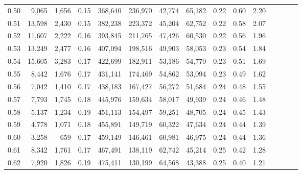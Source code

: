 \begin{tabular}{rrrcrrrrrrrrrrr}
0.50 &   9,065 &   1,656 &                                       0.15 &  368,640 &  236,970 &   42,774 &   65,182 &  0.22 &  0.60 &                         2.20 \\
0.51 &  13,598 &   2,430 &                                       0.15 &  382,238 &  223,372 &   45,204 &   62,752 &  0.22 &  0.58 &                         2.07 \\
0.52 &  11,607 &   2,222 &                                       0.16 &  393,845 &  211,765 &   47,426 &   60,530 &  0.22 &  0.56 &                         1.96 \\
0.53 &  13,249 &   2,477 &                                       0.16 &  407,094 &  198,516 &   49,903 &   58,053 &  0.23 &  0.54 &                         1.84 \\
0.54 &  15,605 &   3,283 &                                       0.17 &  422,699 &  182,911 &   53,186 &   54,770 &  0.23 &  0.51 &                         1.69 \\
0.55 &   8,442 &   1,676 &                                       0.17 &  431,141 &  174,469 &   54,862 &   53,094 &  0.23 &  0.49 &                         1.62 \\
0.56 &   7,042 &   1,410 &                                       0.17 &  438,183 &  167,427 &   56,272 &   51,684 &  0.24 &  0.48 &                         1.55 \\
0.57 &   7,793 &   1,745 &                                       0.18 &  445,976 &  159,634 &   58,017 &   49,939 &  0.24 &  0.46 &                         1.48 \\
0.58 &   5,137 &   1,234 &                                       0.19 &  451,113 &  154,497 &   59,251 &   48,705 &  0.24 &  0.45 &                         1.43 \\
0.59 &   4,778 &   1,071 &                                       0.18 &  455,891 &  149,719 &   60,322 &   47,634 &  0.24 &  0.44 &                         1.39 \\
0.60 &   3,258 &     659 &                                       0.17 &  459,149 &  146,461 &   60,981 &   46,975 &  0.24 &  0.44 &                         1.36 \\
0.61 &   8,342 &   1,761 &                                       0.17 &  467,491 &  138,119 &   62,742 &   45,214 &  0.25 &  0.42 &                         1.28 \\
0.62 &   7,920 &   1,826 &                                       0.19 &  475,411 &  130,199 &   64,568 &   43,388 &  0.25 &  0.40 &                         1.21 \\

\end{tabular}
